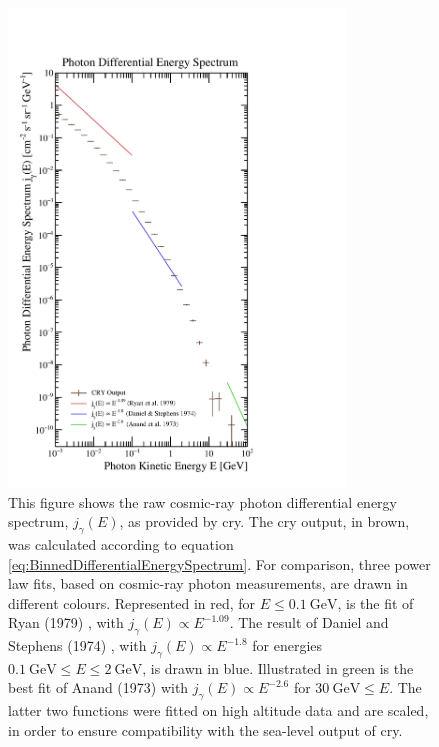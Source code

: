 \begin{figure}[htbp]
    \centering
    \includegraphics[width=0.8\textwidth]{images/CosmicGammaBackground/CRYKineticEnergy.pdf}
    \caption[Raw Cosmic-Ray Photon Differential Energy Spectrum Provided by CRY]{This figure shows the raw cosmic-ray photon differential energy spectrum, $j_\gamma(E)$, as provided by \gls{cry}. The \gls{cry} output, in brown, was calculated according to equation \ref{eq:BinnedDifferentialEnergySpectrum}. For comparison, three power law fits, based on cosmic-ray photon measurements, are drawn in different colours. Represented in red, for $E \leq \SI{0.1}{\giga\electronvolt}$, is the fit of Ryan \etal (1979) \cite{CosmicGammaSpectrumFit1}, with $j_\gamma(E) \propto E^{-1.09}$. The result of Daniel and Stephens (1974) \cite{CosmicGammaSpectrumFit2}, with $j_\gamma(E) \propto E^{-1.8}$ for energies $\SI{0.1}{\giga\electronvolt} \leq E \leq \SI{2}{\giga\electronvolt}$, is drawn in blue. Illustrated in green is the best fit of Anand \etal (1973) \cite{CosmicGammaSpectrumFit3} with $j_\gamma(E) \propto E^{-2.6}$ for $\SI{30}{\giga\electronvolt} \leq E$. The latter two functions were fitted on high altitude data and are scaled, in order to ensure compatibility with the sea-level output of \gls{cry}.}
    \label{fig:CRYKineticEnergy}
\end{figure}
